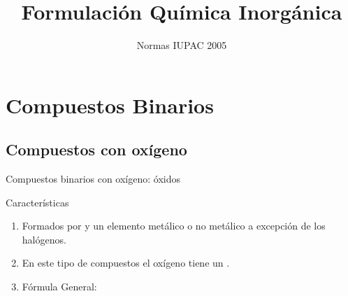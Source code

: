 \documentclass{beamer}
\title{Formulación Química Inorgánica}
\subtitle{Normas IUPAC 2005}
\author{}
\institute{\textbf{Tipos de compuestos} Compuestos binarios: Óxidos, Hidruros, Peróxidos, Hidróxidos. Oxoácidos. Oxosales}
\date{}
\newcommand*{\numberballmDarkTeal}{\protect\cnumero{\arabic*}{mDarkTeal}}
\begin{document}
\begin{frame}
    \titlepage
\end{frame}

\begin{frame}
    \tableofcontents
\end{frame}


\section{Compuestos Binarios}

\subsection{Compuestos con oxígeno}

\begin{frame}[t]{Compuestos binarios con oxígeno: óxidos}\vspace{10pt}
    \begin{block}{\Large Características}
        \begin{enumerate}[label=\numberballmDarkTeal]
            \item Formados por  y un elemento metálico o no metálico a excepción de los \alert{halógenos}.
            \item En este tipo de compuestos el oxígeno tiene un .
            \item Fórmula General: 
        \end{enumerate}
    \end{block}



\end{frame}
\end{document}
